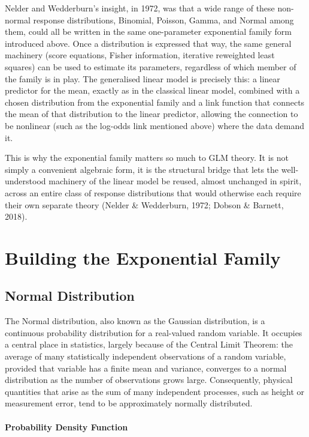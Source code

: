 \documentclass[12pt,a4paper]{report}
\begin{document}
Nelder and Wedderburn's insight, in 1972, was that a wide range of these non-normal response distributions, Binomial, Poisson, Gamma, and Normal among them, could all be written in the same one-parameter exponential family form introduced above. Once a distribution is expressed that way, the same general machinery (score equations, Fisher information, iterative reweighted least squares) can be used to estimate its parameters, regardless of which member of the family is in play. The generalised linear model is precisely this: a linear predictor for the mean, exactly as in the classical linear model, combined with a chosen distribution from the exponential family and a link function that connects the mean of that distribution to the linear predictor, allowing the connection to be nonlinear (such as the log-odds link mentioned above) where the data demand it.

This is why the exponential family matters so much to GLM theory. It is not simply a convenient algebraic form, it is the structural bridge that lets the well-understood machinery of the linear model be reused, almost unchanged in spirit, across an entire class of response distributions that would otherwise each require their own separate theory (Nelder \& Wedderburn, 1972; Dobson \& Barnett, 2018).

\chapter{Building the Exponential Family}

\section{Normal Distribution}

The Normal distribution, also known as the Gaussian distribution, is a continuous probability distribution for a real-valued random variable. It occupies a central place in statistics, largely because of the Central Limit Theorem: the average of many statistically independent observations of a random variable, provided that variable has a finite mean and variance, converges to a normal distribution as the number of observations grows large. Consequently, physical quantities that arise as the sum of many independent processes, such as height or measurement error, tend to be approximately normally distributed.

\subsubsection*{Probability Density Function}
\end{document}
